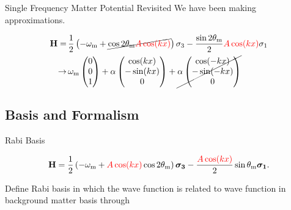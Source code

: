 \documentclass[9pt]{beamer}
\begin{document}
\begin{darkframes}
\begin{frame}{Single Frequency Matter Potential Revisited}
We have been making approximations.


\begin{align*}
    \mathbf {H} =\,& \frac{1}{2}\left( - \omega_{\mathrm{m}}
    +\cancel{
     \cos 2\theta_{\mathrm{m}}{\color{red}A\cos(kx)} } \right) \sigma_3 - \frac{  \sin 2\theta_{\mathrm{m}
    }
    }{2}{\color{red}A \cos(kx)}  \sigma_1 \\
    \to\, &  \omega_{\mathrm m}\begin{pmatrix}
    0\\
    0\\
    1
    \end{pmatrix} + \alpha \begin{pmatrix}
    \cos (kx)\\
    -\sin(k x)\\
    0
    \end{pmatrix}  + \cancel{\alpha \begin{pmatrix}
    \cos (-kx)\\
    -\sin( - k x)\\
    0
    \end{pmatrix}
    }
\end{align*}


\end{frame}



\subsection{Basis and Formalism}



\begin{frame}{Rabi Basis}



\begin{tcolorbox}[title=Hamiltonian in Background Matter Basis]
    \begin{equation*}
    \mathbf {H} = \frac{1}{2}\left( - \omega_{\mathrm{m}} + {\color{red}A\cos(kx)} \cos 2\theta_{\mathrm{m}} \right) \boldsymbol{\sigma_3} - \frac{  {\color{red}A\cos (kx)}  }{2} \sin \theta_{\mathrm{m}} \boldsymbol{\sigma_1}.
\end{equation*}
\end{tcolorbox}


\begin{tcolorbox}[title=A Better Basis]


Define Rabi basis %
in which the wave function is related to wave function in background matter basis
through


\end{tcolorbox}
\end{frame}
\end{darkframes}
\end{document}
